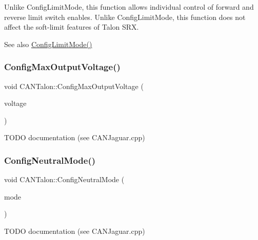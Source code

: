 Unlike Config\+Limit\+Mode, this function allows individual control of forward and reverse limit switch enables. Unlike Config\+Limit\+Mode, this function does not affect the soft-\/limit features of Talon S\+RX. \begin{DoxySeeAlso}{See also}
\hyperlink{class_c_a_n_talon_a6720f4720939dd590b1db6a33d09aef2}{Config\+Limit\+Mode()} 
\end{DoxySeeAlso}
\mbox{\label{class_c_a_n_talon_a6096b39afee6f6c6595d1fed5369a15b}} 
\subsubsection{\texorpdfstring{Config\+Max\+Output\+Voltage()}{ConfigMaxOutputVoltage()}}
{\footnotesize\ttfamily void C\+A\+N\+Talon\+::\+Config\+Max\+Output\+Voltage (\begin{DoxyParamCaption}\item[{double}]{voltage }\end{DoxyParamCaption})\hspace{0.3cm}{\ttfamily [override]}}

T\+O\+DO documentation (see C\+A\+N\+Jaguar.\+cpp) \mbox{\label{class_c_a_n_talon_a7a6a2ce755982ff35031664736927026}} 
\subsubsection{\texorpdfstring{Config\+Neutral\+Mode()}{ConfigNeutralMode()}}
{\footnotesize\ttfamily void C\+A\+N\+Talon\+::\+Config\+Neutral\+Mode (\begin{DoxyParamCaption}\item[{Neutral\+Mode}]{mode }\end{DoxyParamCaption})\hspace{0.3cm}{\ttfamily [override]}}

T\+O\+DO documentation (see C\+A\+N\+Jaguar.\+cpp) \mbox{\label{class_c_a_n_talon_a1d35425facbcfd512003c545dfe81861}} 
